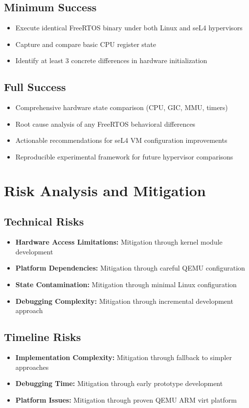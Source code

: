 \documentclass[11pt,a4paper]{article}
\begin{document}
\subsection{Minimum Success}
\begin{itemize}
    \item Execute identical FreeRTOS binary under both Linux and seL4 hypervisors
    \item Capture and compare basic CPU register state
    \item Identify at least 3 concrete differences in hardware initialization
\end{itemize}

\subsection{Full Success}
\begin{itemize}
    \item Comprehensive hardware state comparison (CPU, GIC, MMU, timers)
    \item Root cause analysis of any FreeRTOS behavioral differences
    \item Actionable recommendations for seL4 VM configuration improvements
    \item Reproducible experimental framework for future hypervisor comparisons
\end{itemize}

\section{Risk Analysis and Mitigation}

\subsection{Technical Risks}
\begin{itemize}
    \item \textbf{Hardware Access Limitations:} Mitigation through kernel module development
    \item \textbf{Platform Dependencies:} Mitigation through careful QEMU configuration
    \item \textbf{State Contamination:} Mitigation through minimal Linux configuration
    \item \textbf{Debugging Complexity:} Mitigation through incremental development approach
\end{itemize}

\subsection{Timeline Risks}
\begin{itemize}
    \item \textbf{Implementation Complexity:} Mitigation through fallback to simpler approaches
    \item \textbf{Debugging Time:} Mitigation through early prototype development
    \item \textbf{Platform Issues:} Mitigation through proven QEMU ARM virt platform
\end{itemize}
\end{document}
